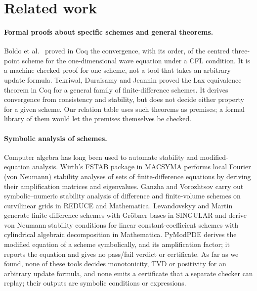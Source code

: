 \documentclass[11pt,a4paper]{article}
\begin{document}
\section{Related work}\label{sec:related}

\paragraph{Formal proofs about specific schemes and general theorems.} Boldo et al.\
\cite{boldo2010} proved in Coq the convergence, with its order, of the centred three-point scheme for
the one-dimensional wave equation under a CFL condition. It is a machine-checked proof for one scheme,
not a tool that takes an arbitrary update formula. Tekriwal, Duraisamy and Jeannin \cite{tekriwal2021}
proved the Lax equivalence theorem in Coq for a general family of finite-difference schemes. It
derives convergence from consistency and stability, but does not decide either property for a given
scheme. Our relation table uses such theorems as premises; a formal library of them would let the
premises themselves be checked.

\paragraph{Symbolic analysis of schemes.} Computer algebra has long been used to automate stability
and modified-equation analysis. Wirth's FSTAB package in MACSYMA \cite{wirth1980} performs local
Fourier (von Neumann) stability analyses of sets of finite-difference equations by deriving their
amplification matrices and eigenvalues. Ganzha and Vorozhtsov \cite{ganzha1999} carry out
symbolic--numeric stability analysis of difference and finite-volume schemes on curvilinear grids
in REDUCE and Mathematica. Levandovskyy and Martin \cite{martin2012} generate finite difference
schemes with Gr\"obner bases in SINGULAR and derive von Neumann stability conditions for linear
constant-coefficient schemes with cylindrical algebraic decomposition in Mathematica. PyModPDE
\cite{pymodpde2020} derives the modified equation of a scheme symbolically, and its amplification factor; it reports the equation
and gives no pass/fail verdict or certificate. As far as we found, none of these tools decides
monotonicity, TVD or positivity for an arbitrary update formula, and none emits a certificate that a
separate checker can replay; their outputs are symbolic conditions or expressions.
\end{document}
